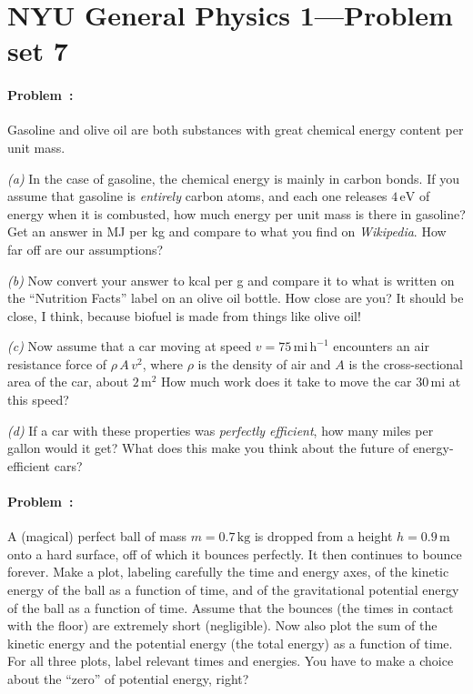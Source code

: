\documentclass[12pt]{article}
\newcommand{\kg}{\mathrm{kg}}
\newcommand{\m}{\mathrm{m}}
\newcommand{\mi}{\mathrm{mi}}
\newcommand{\h}{\mathrm{h}}
\newcommand{\eV}{\mathrm{eV}}
\newcounter{problem}
\begin{document}
\thispagestyle{empty}

\section*{NYU General Physics 1---Problem set 7}

\paragraph{Problem~\theproblem:}%
Gasoline and olive oil are both substances with great chemical energy
content per unit mass.

\textsl{(a)} In the case of gasoline, the chemical energy is mainly in
carbon bonds.  If you assume that gasoline is \emph{entirely} carbon
atoms, and each one releases $4\,\eV$ of energy when it is combusted, how
much energy per unit mass is there in gasoline?  Get an answer in MJ
per kg and compare to what you find on \textit{Wikipedia}.  How far off
are our assumptions?

\textsl{(b)} Now convert your answer to kcal per g and compare it to
what is written on the ``Nutrition Facts'' label on an olive oil
bottle.  How close are you?  It should be close, I think, because
biofuel is made from things like olive oil!

\textsl{(c)} Now assume that a car moving at speed
$v=75\,\mi\,\h^{-1}$ encounters an air resistance force of
$\rho\,A\,v^2$, where $\rho$ is the density of air and $A$ is the
cross-sectional area of the car, about $2\,\m^2$ How much work does it
take to move the car $30\,\mi$ at this speed?

\textsl{(d)} If a car with these properties was \emph{perfectly
  efficient}, how many miles per gallon would it get?  What does this
make you think about the future of energy-efficient cars?

\paragraph{Problem~\theproblem:}%
A (magical) perfect ball of mass $m=0.7\,\kg$ is dropped from a height
$h=0.9\,\m$ onto a hard surface, off of which it bounces perfectly.
It then continues to bounce forever.  Make a plot, labeling carefully
the time and energy axes, of the kinetic energy of the ball as a function of
time, and of the gravitational potential energy of the ball as a
function of time.  Assume that the bounces (the times in contact with
the floor) are extremely short (negligible).  Now also plot the sum of
the kinetic energy and the potential energy (the total energy) as a
function of time.  For all three plots, label relevant times and
energies.  You have to make a choice about the ``zero'' of potential
energy, right?
\end{document}
